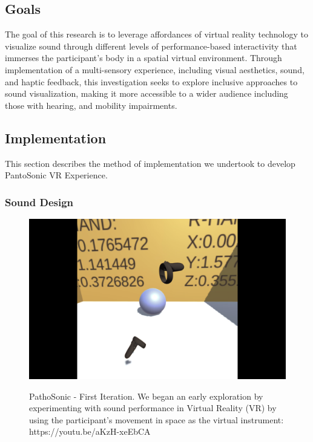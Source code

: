 \documentclass{nime-alternate}
\begin{document}
\subsection{Goals}
The goal of this research is to leverage affordances of virtual reality technology to visualize sound through different levels of performance-based interactivity that immerses the participant's body in a spatial virtual environment. Through implementation of a multi-sensory experience, including visual aesthetics, sound, and haptic feedback, this investigation seeks to explore inclusive approaches to sound visualization, making it more accessible to a wider audience including those with hearing, and mobility impairments.


\subsection{Implementation}

This section describes the method of implementation we undertook to develop PantoSonic VR Experience.

\subsubsection{Sound Design}


\begin{figure}[htbp]
       \centering
              \includegraphics[width=1\textwidth]{first_iteration.png}
       \label{PathoSonic - First Iteration. We began an early exploration by experimenting with sound performance in Virtual Reality (VR) by using the participant's movement in space as the virtual instrument: https://youtu.be/aKzH-xeEbCA}
       \caption{PathoSonic - First Iteration. We began an early exploration by experimenting with sound performance in Virtual Reality (VR) by using the participant's movement in space as the virtual instrument: https://youtu.be/aKzH-xeEbCA}
\end{figure}
\end{document}
